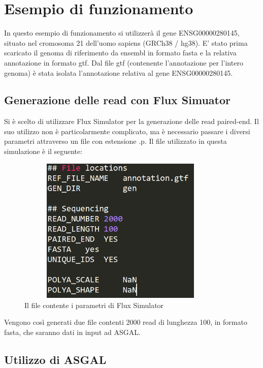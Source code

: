 \section{Esempio di funzionamento}

In questo esempio di funzionamento si utilizzerà il gene ENSG00000280145, situato nel cromosoma 21 dell'uomo sapiens (GRCh38 / hg38). E' stato prima scaricato il   genoma di riferimento da ensembl in formato fasta e la relativa annotazione in formato gtf. Dal file gtf (contenente l'annotazione per l'intero genoma) è stata isolata l'annotazione relativa al gene ENSG00000280145.

\subsection{Generazione delle read con Flux Simuator}

Si è scelto di utilizzare Flux Simulator per la generazione delle read paired-end. Il suo utilizzo non è particolarmente complicato, ma è necessario passare i diversi parametri attraverso un file con estensione .p. Il file utilizzato in questa simulazione è il seguente:

\begin{figure}[h]
	\centering
	\includegraphics[height=7cm,width=10cm]{images/parameters2.png}
  \caption{Il file contente i parametri di Flux Simulator}
  \label{fig:Parameters}
\end{figure}

Vengono così generati due file contenti 2000 read di lunghezza 100, in formato fasta, che saranno dati in input ad ASGAL.

\newpage

\subsection{Utilizzo di ASGAL}

